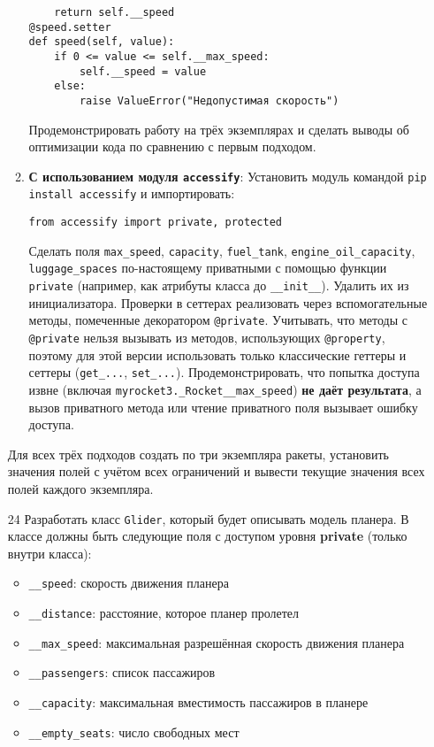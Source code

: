 \begin{enumerate}
\begin{enumerate}
\begin{verbatim}
    return self.__speed
@speed.setter
def speed(self, value):
    if 0 <= value <= self.__max_speed:
        self.__speed = value
    else:
        raise ValueError("Недопустимая скорость")
    \end{verbatim}  
    Продемонстрировать работу на трёх экземплярах и сделать выводы об оптимизации кода по сравнению с первым подходом.
    \item \textbf{С использованием модуля \texttt{accessify}}:  
    Установить модуль командой \texttt{pip install accessify} и импортировать:  
    \begin{verbatim}
from accessify import private, protected
    \end{verbatim}  
    Сделать поля \texttt{max\_speed}, \texttt{capacity}, \texttt{fuel\_tank}, \texttt{engine\_oil\_capacity}, \texttt{luggage\_spaces} по-настоящему приватными с помощью функции \texttt{private} (например, как атрибуты класса до \texttt{\_\_init\_\_}). Удалить их из инициализатора.  
    Проверки в сеттерах реализовать через вспомогательные методы, помеченные декоратором \texttt{@private}.  
    Учитывать, что методы с \texttt{@private} нельзя вызывать из методов, использующих \texttt{@property}, поэтому для этой версии использовать только классические геттеры и сеттеры (\texttt{get\_...}, \texttt{set\_...}).  
    Продемонстрировать, что попытка доступа извне (включая \texttt{myrocket3.\_Rocket\_\_max\_speed}) \textbf{не даёт результата}, а вызов приватного метода или чтение приватного поля вызывает ошибку доступа.
\end{enumerate}
Для всех трёх подходов создать по три экземпляра ракеты, установить значения полей с учётом всех ограничений и вывести текущие значения всех полей каждого экземпляра.
\item[24] Разработать класс \texttt{Glider}, который будет описывать модель планера. В классе должны быть следующие поля с доступом уровня \textbf{private} (только внутри класса):
\begin{itemize}
    \item \texttt{\_\_speed}: скорость движения планера  
    \item \texttt{\_\_distance}: расстояние, которое планер пролетел  
    \item \texttt{\_\_max\_speed}: максимальная разрешённая скорость движения планера  
    \item \texttt{\_\_passengers}: список пассажиров  
    \item \texttt{\_\_capacity}: максимальная вместимость пассажиров в планере  
    \item \texttt{\_\_empty\_seats}: число свободных мест  

\end{itemize}
\end{enumerate}
